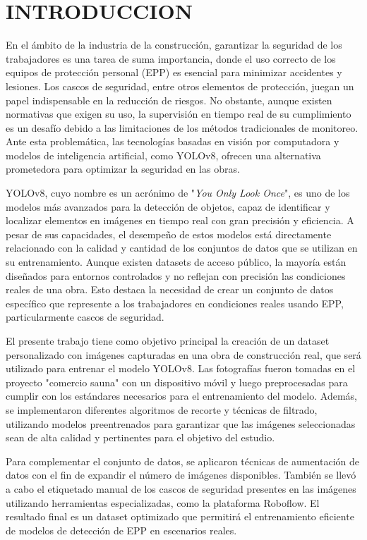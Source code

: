 \chapter{INTRODUCCION}
En el ámbito de la industria de la construcción, garantizar la seguridad de los trabajadores es una tarea de suma importancia, donde el uso correcto de los equipos de protección personal (EPP) es esencial para minimizar accidentes y lesiones. Los cascos de seguridad, entre otros elementos de protección, juegan un papel indispensable en la reducción de riesgos. No obstante, aunque existen normativas que exigen su uso, la supervisión en tiempo real de su cumplimiento es un desafío debido a las limitaciones de los métodos tradicionales de monitoreo. Ante esta problemática, las tecnologías basadas en visión por computadora y modelos de inteligencia artificial, como YOLOv8, ofrecen una alternativa prometedora para optimizar la seguridad en las obras.

YOLOv8, cuyo nombre es un acrónimo de "\textit{You Only Look Once}", es uno de los modelos más avanzados para la detección de objetos, capaz de identificar y localizar elementos en imágenes en tiempo real con gran precisión y eficiencia. A pesar de sus capacidades, el desempeño de estos modelos está directamente relacionado con la calidad y cantidad de los conjuntos de datos que se utilizan en su entrenamiento. Aunque existen datasets de acceso público, la mayoría están diseñados para entornos controlados y no reflejan con precisión las condiciones reales de una obra. Esto destaca la necesidad de crear un conjunto de datos específico que represente a los trabajadores en condiciones reales usando EPP, particularmente cascos de seguridad.

El presente trabajo tiene como objetivo principal la creación de un dataset personalizado con imágenes capturadas en una obra de construcción real, que será utilizado para entrenar el modelo YOLOv8. Las fotografías fueron tomadas en el proyecto "comercio sauna" con un dispositivo móvil y luego preprocesadas para cumplir con los estándares necesarios para el entrenamiento del modelo. Además, se implementaron diferentes algoritmos de recorte y técnicas de filtrado, utilizando modelos preentrenados para garantizar que las imágenes seleccionadas sean de alta calidad y pertinentes para el objetivo del estudio.

Para complementar el conjunto de datos, se aplicaron técnicas de aumentación de datos con el fin de expandir el número de imágenes disponibles. También se llevó a cabo el etiquetado manual de los cascos de seguridad presentes en las imágenes utilizando herramientas especializadas, como la plataforma Roboflow. El resultado final es un dataset optimizado que permitirá el entrenamiento eficiente de modelos de detección de EPP en escenarios reales.

